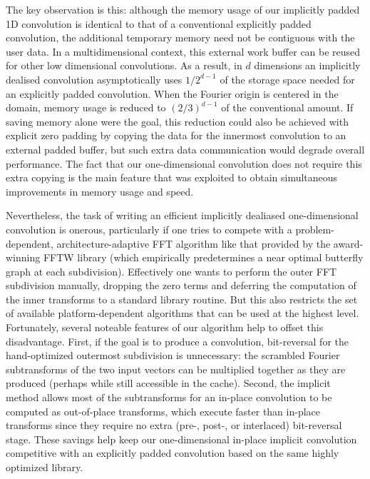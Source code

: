 \documentclass[final]{siamltex}
\begin{document}
The key observation is this: although the memory usage of our implicitly
padded 1D convolution is identical to that of a conventional explicitly
padded convolution, the additional temporary memory need not be contiguous
with the user data.  In a multidimensional context, this external work
buffer can be reused for other low dimensional convolutions.
As a result, in $d$ dimensions an implicitly dealised convolution
asymptotically uses $1/2^{d-1}$ of the
storage space needed for an explicitly padded convolution. When the Fourier origin is
centered in the domain, memory usage is reduced to $(2/3)^{d-1}$ of the
conventional amount.
If saving memory alone were the goal, this reduction could
also be achieved with explicit zero padding by copying the data for the
innermost convolution to an external padded buffer, but such extra data
communication would degrade overall performance. The fact that our
one-dimensional convolution does not require this extra copying is the
main feature that was exploited to obtain simultaneous improvements in
memory usage and speed.

Nevertheless, the task of writing an efficient implicitly dealiased
one-dimensional convolution is onerous, particularly if one tries to
compete with a problem-dependent, architecture-adaptive
FFT algorithm like that provided by the award-winning FFTW \cite{Frigo05}
library (which empirically predetermines a near optimal butterfly graph
at each subdivision). Effectively one wants to perform
the outer FFT subdivision manually, dropping the zero terms and
deferring the computation of the inner transforms to a standard library
routine. But this also restricts the set of available platform-dependent
algorithms that can be used at the highest level. Fortunately, several 
noteable features of our algorithm help to offset this disadvantage. First, if
the goal is to  produce a convolution, bit-reversal for the hand-optimized
outermost subdivision is unnecessary: the scrambled Fourier subtransforms of the
two input vectors can be multiplied together as they are produced
(perhaps while still accessible in the cache). Second, the implicit
method allows most of the subtransforms for an in-place convolution to
be computed as out-of-place transforms, which execute faster than
in-place transforms since they require no extra (pre-, post-, or
interlaced) bit-reversal stage.  These savings help keep our
one-dimensional in-place implicit convolution competitive with an
explicitly padded convolution based on the same highly optimized
library.
\end{document}
